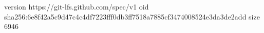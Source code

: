 version https://git-lfs.github.com/spec/v1
oid sha256:6e8f42a5c9d47c4c4df7223fff0db3ff7518a7885cf3474008524e3da3de2add
size 6946
